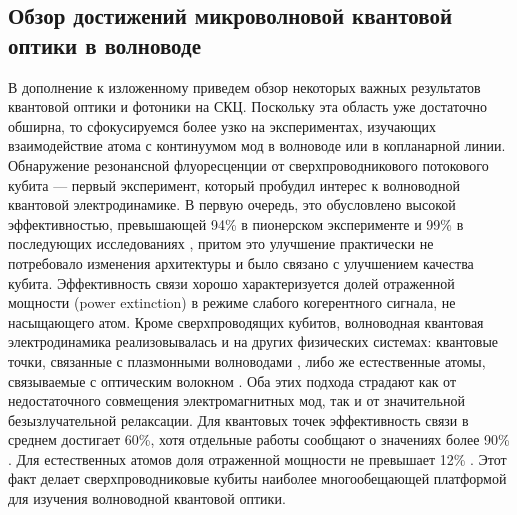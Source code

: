 \subsection{Обзор достижений микроволновой квантовой оптики в волноводе}
В дополнение к изложенному приведем обзор некоторых важных результатов квантовой оптики и фотоники на СКЦ. Поскольку эта область уже достаточно обширна, то сфокусируемся более узко на экспериментах, изучающих взаимодействие атома с континуумом мод в волноводе или в копланарной линии. Обнаружение резонансной флуоресценции от сверхпроводникового потокового кубита \cite{Astafiev2010resonance} --- первый эксперимент, который пробудил интерес к волноводной квантовой электродинамике. В первую очередь, это обусловлено высокой эффективностью, превышающей 94\% в пионерском эксперименте и 99\% в последующих исследованиях \cite{single-photon-router,Delsing-giant-Kross-Kerr}, притом это улучшение практически не потребовало изменения архитектуры и было связано с улучшением качества кубита. Эффективность связи хорошо характеризуется долей отраженной мощности (power extinction) в режиме слабого когерентного сигнала, не насыщающего атом. Кроме сверхпроводящих кубитов, волноводная квантовая электродинамика реализовывалась и на других физических системах: квантовые точки, связанные с плазмонными волноводами \cite{akimov2007generation,martin2010resonance}, либо же естественные атомы, связываемые с оптическим волокном \cite{Vetsch2010,Goban2012fibertrap}. Оба этих подхода страдают как от недостаточного совмещения электромагнитных мод, так и от значительной безызлучательной релаксации. Для квантовых точек эффективность связи в среднем достигает 60\%, хотя отдельные работы сообщают о значениях более 90\% \cite{Arcari2014NearUnity}. Для естественных атомов доля отраженной мощности не превышает 12\% \cite{tey2008strong-int,Gerhard2007moleculeExt}. Этот факт делает сверхпроводниковые кубиты наиболее многообещающей платформой для изучения волноводной квантовой оптики.


